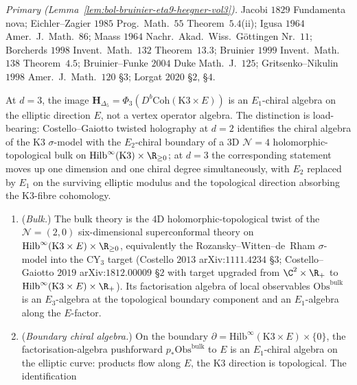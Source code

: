 \emph{Primary (Lemma~\ref{lem:bol-bruinier-eta9-heegner-vol3}).}
Jacobi $1829$ Fundamenta nova;
Eichler--Zagier $1985$ Prog.\ Math.\ $55$ Theorem~$5.4$(ii);
Igusa $1964$ Amer.\ J.\ Math.\ $86$;
Maass $1964$ Nachr.\ Akad.\ Wiss.\ G\"ottingen Nr.\ $11$;
Borcherds $1998$ Invent.\ Math.\ $132$ Theorem~$13.3$;
Bruinier $1999$ Invent.\ Math.\ $138$ Theorem~$4.5$;
Bruinier--Funke $2004$ Duke Math.\ J.\ $125$;
Gritsenko--Nikulin $1998$ Amer.\ J.\ Math.\ $120$ \S$3$;
Lorgat $2020$ \S$2$, \S$4$.

\begin{remark}
\label{rem:hdelta5-cg-e1-chiral-holography}
At $d=3$, the image $\mathbf H_{\Delta_5}=\Phi_3(D^b\mathrm{Coh}(\mathrm{K3}\times E))$ is an $E_1$-chiral algebra on the elliptic direction $E$, not a vertex operator algebra. The distinction is load-bearing: Costello--Gaiotto twisted holography at $d=2$ identifies the chiral algebra of the K3 $\sigma$-model with the $E_2$-chiral boundary of a $3$D $\mathcal N=4$ holomorphic-topological bulk on $\mathrm{Hilb}^\infty(\mathrm{K3})\times\R_{\geq 0}$; at $d=3$ the corresponding statement moves up one dimension and one chiral degree simultaneously, with $E_2$ replaced by $E_1$ on the surviving elliptic modulus and the topological direction absorbing the K3-fibre cohomology.
\begin{enumerate}[label=(\roman*),leftmargin=1.5em]
 \item (\emph{Bulk.}) The bulk theory is the $4$D holomorphic-topological twist of the $\mathcal N=(2,0)$ six-dimensional superconformal theory on $\mathrm{Hilb}^\infty(\mathrm{K3}\times E)\times\R_{\geq 0}$, equivalently the Rozansky--Witten--de~Rham $\sigma$-model into the $\mathrm{CY}_3$ target (Costello $2013$ arXiv:$1111.4234$ \S$3$; Costello--Gaiotto $2019$ arXiv:$1812.00009$ \S$2$ with target upgraded from $\C^2\times\R_+$ to $\mathrm{Hilb}^\infty(\mathrm{K3}\times E)\times\R_+$). Its factorisation algebra of local observables $\mathrm{Obs}^{\mathrm{bulk}}$ is an $E_3$-algebra at the topological boundary component and an $E_1$-algebra along the $E$-factor.
 \item (\emph{Boundary chiral algebra.}) On the boundary $\partial=\mathrm{Hilb}^\infty(\mathrm{K3}\times E)\times\{0\}$, the factorisation-algebra pushforward $p_\ast\mathrm{Obs}^{\mathrm{bulk}}$ to $E$ is an $E_1$-chiral algebra on the elliptic curve: products flow along $E$, the K3 direction is topological. The identification

\end{enumerate}
\end{remark}

